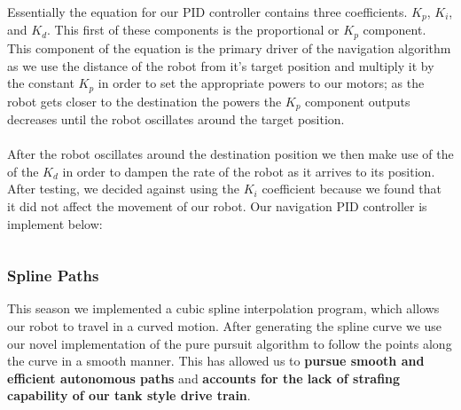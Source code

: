 \documentclass[a4paper,12pt]{article}
\begin{document}
\noindent Essentially the equation for our PID controller contains three coefficients. $K_p$, $K_i$, and $K_d$. This first of these components is the proportional or $K_p$ component. This component of the equation is the primary driver of the navigation algorithm as we use the distance of the robot from it's target position and multiply it by the constant $K_p$ in order to set the appropriate powers to our motors; as the robot gets closer to the destination the powers the $K_p$ component outputs decreases until the robot oscillates around the target position.
\\ 
\\
After the robot oscillates around the destination position we then make use of the of the $K_d$ in order to dampen the rate of the robot as it arrives to its position. After testing, we decided against using the $K_i$ coefficient because we found that it did not affect the movement of our robot.
\newpage
\noindent Our navigation PID controller is implement below:

\inputminted[linenos, numbersep=5pt, tabsize=4, frame=lines, label=PID Implementation, escapeinside=||,mathescape=true]{java}{{CodeFiles/PID.java}}

\newpage
\thispagestyle{empty}
\subsubsection{Spline Paths}
This season we implemented a cubic spline interpolation program, which allows our robot to travel in a curved motion. After generating the spline curve we use our novel implementation of the pure pursuit algorithm to follow the points along the curve in a smooth manner. This has allowed us to \textbf{pursue smooth and efficient autonomous paths} and \textbf{accounts for the lack of strafing capability of our tank style drive train}.
\end{document}

